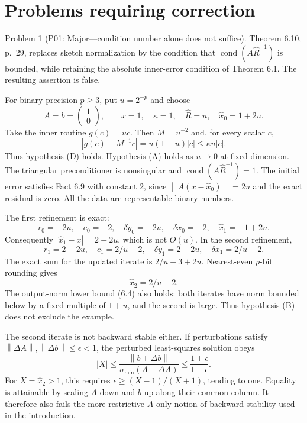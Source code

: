 \documentclass[10pt]{article}
\begin{document}
\section*{Problems requiring correction}
Problem 1 (P01: Major—condition number alone does not suffice).  Theorem 6.10, p. 29, replaces sketch normalization by the condition that \(\operatorname{cond}(A\widehat R^{-1})\) is bounded, while retaining the absolute inner-error condition of Theorem 6.1. The resulting assertion is false.\par
For binary precision \(p\ge3\), put \(u=2^{-p}\) and choose \[A=b=\begin{pmatrix}1\\0\end{pmatrix},\qquad
 x=1,\quad \kappa=1,\quad
 \widehat R=u,\quad \widehat x_0=1+2u.\] Take the inner routine \(g(c)=uc\). Then \(M=u^{-2}\) and, for every scalar \(c\), \[|g(c)-M^{-1}c|=u(1-u)|c|\le\kappa u|c|.\] Thus hypothesis (D) holds. Hypothesis (A) holds as \(u\to0\) at fixed dimension. The triangular preconditioner is nonsingular and \(\operatorname{cond}(A\widehat R^{-1})=1\). The initial error satisfies Fact 6.9 with constant 2, since \(\left\lVert A(x-\widehat x_0)\right\rVert=2u\) and the exact residual is zero. All the data are representable binary numbers.\par
The first refinement is exact: \[r_0=-2u,\quad c_0=-2,\quad
 \delta y_0=-2u,\quad \delta x_0=-2,\quad
 \widehat x_1=-1+2u.\] Consequently \(|\widehat x_1-x|=2-2u\), which is not \(O(u)\). In the second refinement, \[r_1=2-2u,\quad c_1=2/u-2,\quad
 \delta y_1=2-2u,\quad \delta x_1=2/u-2.\] The exact sum for the updated iterate is \(2/u-3+2u\). Nearest-even \(p\)-bit rounding gives \[\widehat x_2=2/u-2.\] The output-norm lower bound (6.4) also holds: both iterates have norm bounded below by a fixed multiple of \(1+u\), and the second is large. Thus hypothesis (B) does not exclude the example.\par
The second iterate is not backward stable either. If perturbations satisfy \(\left\lVert\Delta A\right\rVert,\left\lVert\Delta b\right\rVert\le\epsilon<1\), the perturbed least-squares solution obeys \[|X|\le\frac{\left\lVert b+\Delta b\right\rVert}{\sigma_{\min}(A+\Delta A)}
      \le\frac{1+\epsilon}{1-\epsilon}.\] For \(X=\widehat x_2>1\), this requires \(\epsilon\ge(X-1)/(X+1)\), tending to one. Equality is attainable by scaling \(A\) down and \(b\) up along their common column. It therefore also fails the more restrictive \(A\)-only notion of backward stability used in the introduction.\par
\end{document}
